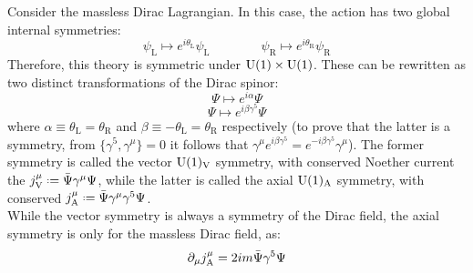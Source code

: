 Consider the massless Dirac Lagrangian. In this case, the action has two global internal symmetries:
\begin{equation*}
  \psi_\text{L} \mapsto e^{i \theta_\text{L}} \psi_\text{L}
  \qquad \qquad
  \psi_\text{R} \mapsto e^{i \theta_\text{R}} \psi_\text{R}
\end{equation*}
Therefore, this theory is symmetric under $ \mathrm{U}(1) \times \mathrm{U}(1) $. These can be rewritten as two distinct transformations of the Dirac spinor:
\begin{equation}
  \Psi \mapsto e^{i \alpha} \Psi
  \label{eq:dirac-u1-symm}
\end{equation}
\begin{equation}
  \Psi \mapsto e^{i \beta \gamma^5} \Psi
\end{equation}
where $ \alpha \equiv \theta_\text{L} = \theta_\text{R} $ and $ \beta \equiv - \theta_\text{L} = \theta_\text{R} $ respectively (to prove that the latter is a symmetry, from $ \{\gamma^5, \gamma^\mu\} = 0 $ it follows that $ \gamma^\mu e^{i \beta \gamma^5} = e^{-i \beta \gamma^5} \gamma^\mu $). The former symmetry is called the vector $ \mathrm{U}(1)_\text{V} $ symmetry, with conserved Noether current the  $ j^\mu_\text{V} \defeq \bar{\Psi} \gamma^\mu \Psi $, while the latter is called the axial $ \mathrm{U}(1)_\text{A} $ symmetry, with conserved  $ j^\mu_\text{A} \defeq \bar{\Psi} \gamma^\mu \gamma^5 \Psi $.\\
While the vector symmetry is always a symmetry of the Dirac field, the axial symmetry is only for the massless Dirac field, as:
\begin{equation}
  \partial_\mu j^\mu_\text{A} = 2 i m \bar{\Psi} \gamma^5 \Psi
\end{equation}










